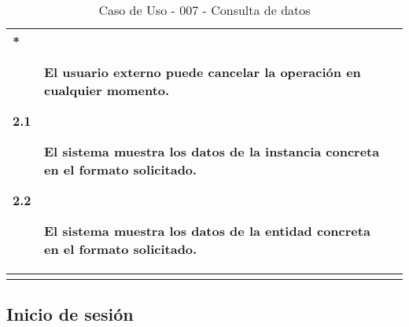 \begin{center}
\begin{longtable}{||p{3.4cm}|p{12cm}||}
\begin{description}
                \item[*] El usuario externo puede cancelar la operación en
                          cualquier momento.
                \item[2.1] El sistema muestra los datos de la instancia concreta
                          en el formato solicitado.
                \item[2.2] El sistema muestra los datos de la entidad concreta en
                          el formato solicitado.
             \end{description}\\
\hline
\hline
\caption{\label{tab:caso007} Caso de Uso - 007 - Consulta de datos} 
\end{longtable}
\end{center}


\subsection{Inicio de sesión}

